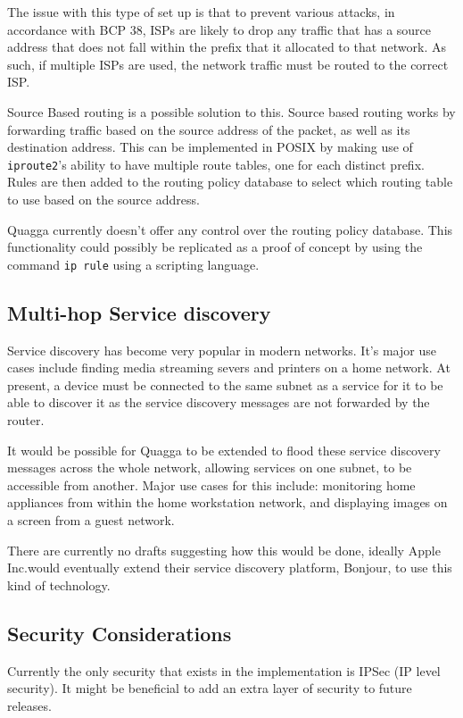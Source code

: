 \documentclass[12pt]{report}
\begin{document}
The issue with this type of set up is that to prevent various attacks, in
accordance with BCP 38, ISPs are likely to drop any traffic that has a source
address that does not fall within the prefix that it allocated to that network.
As such, if multiple ISPs are used, the network traffic must be routed to the
correct ISP. 

Source Based routing is a possible solution to this. Source based routing works
by forwarding traffic based on the source address of the packet, as well as its
destination address. This can be implemented in POSIX by making use of
\texttt{iproute2}'s ability to have multiple route tables, one for each
distinct prefix.  Rules are then added to the routing policy database to select
which routing table to use based on the source address.

Quagga currently doesn't offer any control over the routing policy database.
This functionality could possibly be replicated as a proof of concept by using
the command \texttt{ip rule} using a scripting language.

\subsection{Multi-hop Service discovery}
Service discovery has become very popular in modern networks. It's major use
cases include finding media streaming severs and printers on a home network. At
present, a device must be connected to the same subnet as a service for it to
be able to discover it as the service discovery messages are not forwarded by
the router. 

It would be possible for Quagga to be extended to flood these service discovery
messages across the whole network, allowing services on one subnet, to be
accessible from another. Major use cases for this include: monitoring home
appliances from within the home workstation network, and displaying images on a
screen from a guest network.

There are currently no drafts suggesting how this would be done, ideally Apple
Inc.\@ would eventually extend their service discovery platform, Bonjour, to
use this kind of technology.

\subsection{Security Considerations}
Currently the only security that exists in the implementation is IPSec (IP
level security). It might be beneficial to add an extra layer of security to future 
releases.
\end{document}
